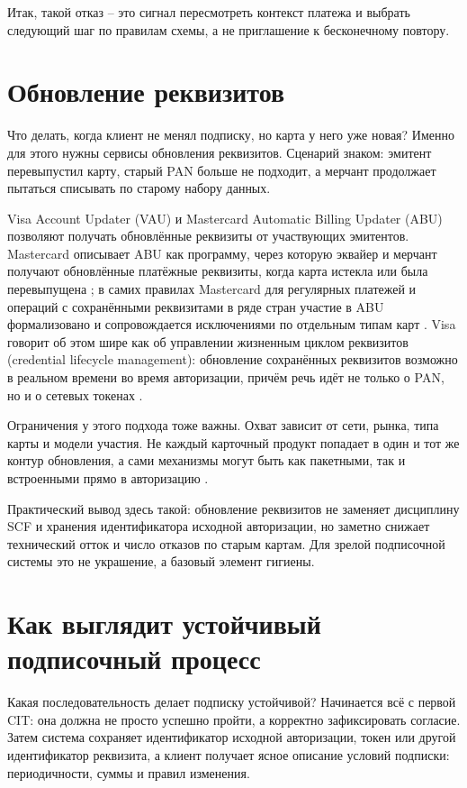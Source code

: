 Итак, такой отказ -- это сигнал пересмотреть контекст платежа и
выбрать следующий шаг по правилам схемы, а не приглашение к
бесконечному повтору.

\section{Обновление реквизитов}
\label{sec:subscriptions-account-updater}

Что делать, когда клиент не менял подписку, но карта у него уже новая?
Именно для этого нужны сервисы обновления реквизитов. Сценарий знаком:
эмитент перевыпустил карту, старый PAN больше не подходит, а мерчант
продолжает пытаться списывать по старому набору данных.

Visa Account Updater (VAU) и Mastercard Automatic Billing Updater
(ABU) позволяют получать обновлённые реквизиты от участвующих
эмитентов. Mastercard описывает ABU как программу, через которую
эквайер и мерчант получают обновлённые платёжные реквизиты, когда
карта истекла или была перевыпущена \cite{mc-abu-privacy}; в самих
правилах Mastercard для регулярных платежей и операций с сохранёнными
реквизитами в ряде стран участие в ABU формализовано и сопровождается
исключениями по отдельным типам карт \cite{mc-tpr}. Visa говорит об
этом шире как об управлении жизненным циклом реквизитов (credential
lifecycle management): обновление сохранённых реквизитов возможно в
реальном времени во время авторизации, причём речь идёт не только о
PAN, но и о сетевых токенах
\cite{visa-lifecycle-management}.

Ограничения у этого подхода тоже важны. Охват зависит от сети, рынка,
типа карты и модели участия. Не каждый карточный продукт попадает в
один и тот же контур обновления, а сами механизмы могут быть как
пакетными, так и встроенными прямо в авторизацию
\cite{mc-tpr}\cite{visa-lifecycle-management}.

Практический вывод здесь такой: обновление реквизитов не заменяет
дисциплину SCF и хранения идентификатора исходной авторизации, но
заметно снижает технический отток и число отказов по старым картам.
Для зрелой подписочной системы это не украшение, а базовый элемент
гигиены.

\section{Как выглядит устойчивый подписочный процесс}
\label{sec:subscriptions-anti-churn}

Какая последовательность делает подписку устойчивой? Начинается всё с
первой CIT: она должна не просто успешно пройти, а корректно
зафиксировать согласие. Затем система сохраняет идентификатор исходной
авторизации, токен или другой идентификатор реквизита, а клиент
получает ясное описание условий подписки:
периодичности, суммы и правил изменения.

